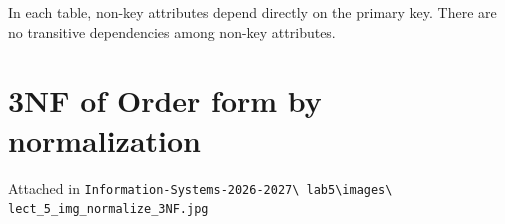 \documentclass[a4paper,12pt]{report}
\begin{document}
In each table, non-key attributes depend directly on the
primary key. There are no transitive dependencies among
non-key attributes.


\section{3NF of Order form by normalization}

Attached in \texttt{Information-Systems-2026-2027\textbackslash
lab5\textbackslash images\textbackslash
lect\_5\_img\_normalize\_3NF.jpg}
\end{document}
